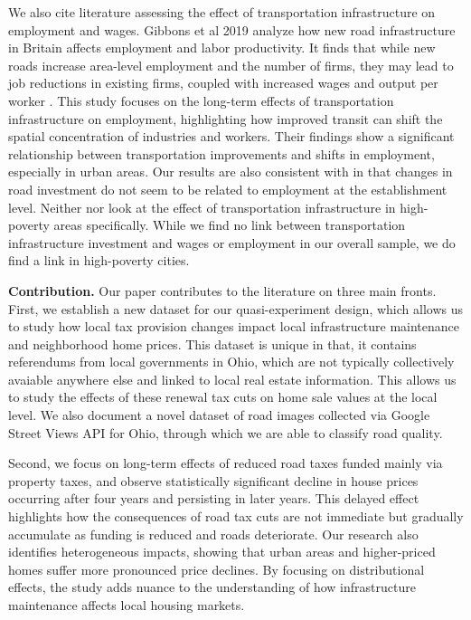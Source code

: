 We also cite literature assessing the effect of transportation infrastructure on employment and wages. Gibbons et al 2019 analyze how new road infrastructure in Britain affects employment and labor productivity. It finds that while new roads increase area-level employment and the number of firms, they may lead to job reductions in existing firms, coupled with increased wages and output per worker \citep{duranton2012}. This study focuses on the long-term effects of transportation infrastructure on employment, highlighting how improved transit can shift the spatial concentration of industries and workers. Their findings show a significant relationship between transportation improvements and shifts in employment, especially in urban areas. Our results are also consistent with \cite{gibbons2019new} in that changes in road investment do not seem to be related to employment at the establishment level.  Neither \cite{dalenberg1995effects} nor \cite{gibbons2019new} look at the effect of transportation infrastructure in high-poverty areas specifically.  While we find no link between transportation infrastructure investment and wages or employment in our overall sample, we do find a link in high-poverty cities.

{\bf Contribution.} Our paper contributes to the literature on three main fronts. First, we establish a new dataset for our quasi-experiment design, which allows us to study how local tax provision changes impact local infrastructure maintenance and neighborhood home prices. This dataset is unique in that, it contains referendums from local governments in Ohio, which are not typically collectively avaiable anywhere else and linked to local real estate information. This allows us to study the effects of these renewal tax cuts on home sale values at the local level. We also document a novel dataset of road images collected via Google Street Views API for Ohio, through which we are able to classify road quality.

Second, we focus on long-term effects of reduced road taxes funded mainly via property taxes, and observe statistically significant decline in house prices occurring after four years and persisting in later years. This delayed effect highlights how the consequences of road tax cuts are not immediate but gradually accumulate as funding is reduced and roads deteriorate. Our research also identifies heterogeneous impacts, showing that urban areas and higher-priced homes suffer more pronounced price declines. By focusing on distributional effects, the study adds nuance to the understanding of how infrastructure maintenance affects local housing markets.

